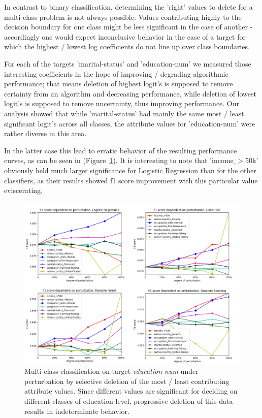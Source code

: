\documentclass{llncs}
\begin{document}
In contrast to binary classification, determining the 'right' values to delete for a multi-class problem is not always possible: Values contributing highly to the decision boundary for one class might be less significant in the case of another - accordingly one would expect inconclusive behavior in the case of a target for which the highest / lowest log coefficients do not line up over class boundaries.

For each of the targets 'marital-status' and 'education-num' we measured those interesting coefficients in the hope of improving / degrading algorithmic performance; that means deletion of highest logit's is supposed to remove certainty from an algorithm and decreasing performance, while deletion of lowest logit's is supposed to remove uncertainty, thus improving performance. Our analysis showed that while 'marital-status' had mainly the same most / least significant logit's across all classes, the attribute values for 'education-num' were rather diverse in this area.

In the latter case this lead to erratic behavior of the resulting performance curves, as can be seen in (Figure~\ref{fig:results_perturbation_education_num}). It is interesting to note that 'income$\_>$50k' obviously held much larger significance for Logistic Regression than for the other classifiers, as their results showed f1 score improvement with this particular value eviscerating.


\begin{figure}[!h]
	\centering
	\includegraphics[width=1\textwidth]{figures/perturbation/adults_education_num/perturb_education_combined}
	\caption{Multi-class classification on target \textit{education-num} under perturbation by selective deletion of the most / least contributing attribute values. Since different values are significant for deciding on different classes of education level, progressive deletion of this data results in indeterminate behavior.}
	\label{fig:results_perturbation_education_num}
\end{figure}
\end{document}
